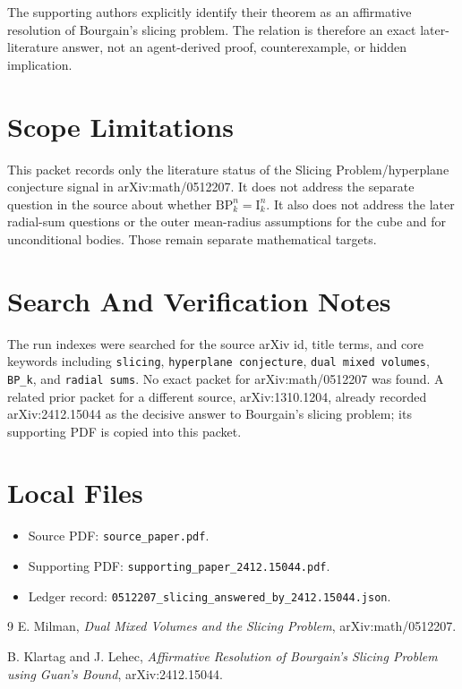 \documentclass[11pt]{article}
\begin{document}
The supporting authors explicitly identify their theorem as an affirmative
resolution of Bourgain's slicing problem. The relation is therefore an exact
later-literature answer, not an agent-derived proof, counterexample, or
hidden implication.

\section*{Scope Limitations}

This packet records only the literature status of the Slicing
Problem/hyperplane conjecture signal in arXiv:math/0512207. It does not address
the separate question in the source about whether \(\mathrm{BP}_k^n =
\mathrm{I}_k^n\). It also does not address the later radial-sum questions or
the outer mean-radius assumptions for the cube and for unconditional bodies.
Those remain separate mathematical targets.

\section*{Search And Verification Notes}

The run indexes were searched for the source arXiv id, title terms, and core
keywords including \texttt{slicing}, \texttt{hyperplane conjecture},
\texttt{dual mixed volumes}, \texttt{BP\_k}, and \texttt{radial sums}. No exact
packet for arXiv:math/0512207 was found. A related prior packet for a different
source, arXiv:1310.1204, already recorded arXiv:2412.15044 as the decisive
answer to Bourgain's slicing problem; its supporting PDF is copied into this
packet.

\section*{Local Files}

\begin{itemize}[leftmargin=2em]
  \item Source PDF: \texttt{source\_paper.pdf}.
  \item Supporting PDF: \texttt{supporting\_paper\_2412.15044.pdf}.
  \item Ledger record:
    \texttt{0512207\_slicing\_answered\_by\_2412.15044.json}.
\end{itemize}

\begin{thebibliography}{9}
E. Milman,
\emph{Dual Mixed Volumes and the Slicing Problem},
arXiv:math/0512207.

B. Klartag and J. Lehec,
\emph{Affirmative Resolution of Bourgain's Slicing Problem using Guan's Bound},
arXiv:2412.15044.
\end{thebibliography}
\end{document}
